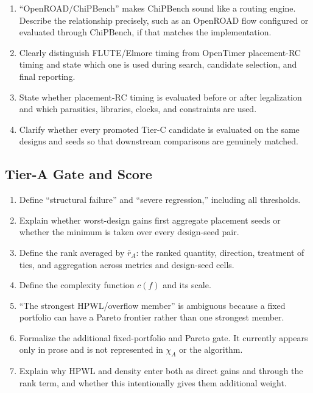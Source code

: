 \documentclass[11pt]{article}
\begin{document}
\begin{enumerate}
  \item ``OpenROAD/ChiPBench'' makes ChiPBench sound like a routing engine.
  Describe the relationship precisely, such as an OpenROAD flow configured or
  evaluated through ChiPBench, if that matches the implementation.

  \item Clearly distinguish FLUTE/Elmore timing from OpenTimer placement-RC
  timing and state which one is used during search, candidate selection, and
  final reporting.

  \item State whether placement-RC timing is evaluated before or after
  legalization and which parasitics, libraries, clocks, and constraints are
  used.

  \item Clarify whether every promoted Tier-C candidate is evaluated on the same
  designs and seeds so that downstream comparisons are genuinely matched.
\end{enumerate}

\subsection{Tier-A Gate and Score}

\begin{enumerate}
  \item Define ``structural failure'' and ``severe regression,'' including all
  thresholds.

  \item Explain whether worst-design gains first aggregate placement seeds or
  whether the minimum is taken over every design-seed pair.

  \item Define the rank averaged by $\bar r_A$: the ranked quantity, direction,
  treatment of ties, and aggregation across metrics and design-seed cells.

  \item Define the complexity function $c(f)$ and its scale.

  \item ``The strongest HPWL/overflow member'' is ambiguous because a fixed
  portfolio can have a Pareto frontier rather than one strongest member.

  \item Formalize the additional fixed-portfolio and Pareto gate. It currently
  appears only in prose and is not represented in $\chi_A$ or the algorithm.

  \item Explain why HPWL and density enter both as direct gains and through the
  rank term, and whether this intentionally gives them additional weight.
\end{enumerate}
\end{document}
